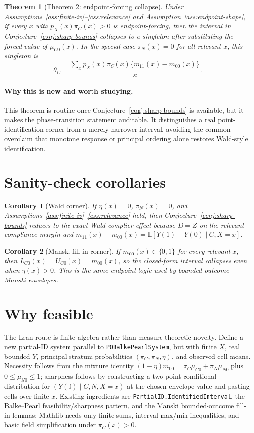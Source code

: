\documentclass[11pt]{article}
\newcommand{\E}{\mathbb{E}}
\theoremstyle{definition}
\theoremstyle{plain}
\newtheorem{theorem}{Theorem}
\newtheorem{corollary}{Corollary}
\theoremstyle{remark}
\begin{document}
\begin{theorem}[Theorem 2: endpoint-forcing collapse]\label{thm:endpoint-collapse}
Under Assumptions~\ref{ass:finite-iv}--\ref{ass:relevance} and Assumption~\ref{ass:endpoint-shape}, if every \(x\) with \(p_X(x)\pi_C(x)>0\) is endpoint-forcing, then the interval in Conjecture~\ref{conj:sharp-bounds} collapses to a singleton after substituting the forced value of \(\mu_{C0}(x)\).  In the special case \(\pi_N(x)=0\) for all relevant \(x\), this singleton is
\[
\theta_C=
\frac{\sum_x p_X(x)\pi_C(x)\{m_{11}(x)-m_{00}(x)\}}{\kappa}.
\]
\end{theorem}
\paragraph{Why this is new and worth studying.}
This theorem is routine once Conjecture~\ref{conj:sharp-bounds} is available, but it makes the phase-transition statement auditable.  It distinguishes a real point-identification corner from a merely narrower interval, avoiding the common overclaim that monotone response or principal ordering alone restores Wald-style identification.

\section{Sanity-check corollaries}
\begin{corollary}[Wald corner]\label{cor:wald-corner}
If \(\eta(x)=0\), \(\pi_N(x)=0\), and Assumptions~\ref{ass:finite-iv}--\ref{ass:relevance} hold, then Conjecture~\ref{conj:sharp-bounds} reduces to the exact Wald complier effect because \(D=Z\) on the relevant compliance margin and \(m_{11}(x)-m_{00}(x)=\E[Y(1)-Y(0)\mid C,X=x]\).
\end{corollary}

\begin{corollary}[Manski fill-in corner]\label{cor:manski-corner}
If \(m_{00}(x)\in\{0,1\}\) for every relevant \(x\), then \(L_{C0}(x)=U_{C0}(x)=m_{00}(x)\), so the closed-form interval collapses even when \(\eta(x)>0\).  This is the same endpoint logic used by bounded-outcome Manski envelopes.
\end{corollary}

\section{Why feasible}
The Lean route is finite algebra rather than measure-theoretic novelty.  Define a new partial-ID system parallel to \texttt{POBalkePearlSystem}, but with finite \(X\), real bounded \(Y\), principal-stratum probabilities \((\pi_C,\pi_N,\eta)\), and observed cell means.  Necessity follows from the mixture identity \((1-\eta)m_{00}=\pi_C\mu_{C0}+\pi_N\mu_{N0}\) plus \(0\le\mu_{N0}\le1\); sharpness follows by constructing a two-point conditional distribution for \((Y(0)\mid C,N,X=x)\) at the chosen envelope value and pasting cells over finite \(x\).  Existing ingredients are \texttt{PartialID.IdentifiedInterval}, the Balke--Pearl feasibility/sharpness pattern, and the Manski bounded-outcome fill-in lemmas; Mathlib needs only finite sums, interval max/min inequalities, and basic field simplification under \(\pi_C(x)>0\).
\end{document}
